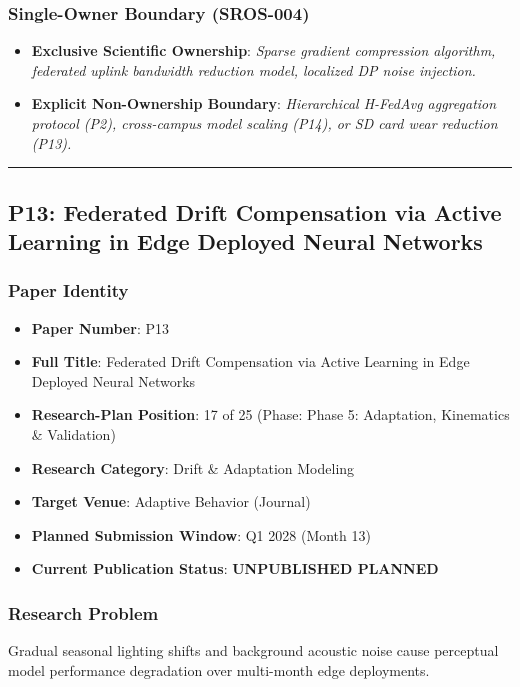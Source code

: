 \documentclass[11pt,letterpaper]{article}
\begin{document}
\subsubsection{Single-Owner Boundary (SROS-004)}
\begin{itemize}[leftmargin=*]
    \item \textbf{Exclusive Scientific Ownership}: \textit{Sparse gradient compression algorithm, federated uplink bandwidth reduction model, localized DP noise injection.}
    \item \textbf{Explicit Non-Ownership Boundary}: \textit{Hierarchical H-\allowbreak FedAvg aggregation protocol (P2), cross-\allowbreak campus model scaling (P14), or SD card wear reduction (P13).}
\end{itemize}

\vspace{0.4cm}
\hrule

\subsection{P13: Federated Drift Compensation via Active Learning in Edge Deployed Neural Networks}
\label{sec:profile_p13}

\subsubsection{Paper Identity}
\begin{itemize}[leftmargin=*]
    \item \textbf{Paper Number}: P13
    \item \textbf{Full Title}: Federated Drift Compensation via Active Learning in Edge Deployed Neural Networks
    \item \textbf{Research-Plan Position}: 17 of 25 (Phase: Phase 5: Adaptation, Kinematics \& Validation)
    \item \textbf{Research Category}: Drift \& Adaptation Modeling
    \item \textbf{Target Venue}: Adaptive Behavior (Journal)
    \item \textbf{Planned Submission Window}: Q1 2028 (Month 13)
    \item \textbf{Current Publication Status}: \textbf{UNPUBLISHED PLANNED}
\end{itemize}

\subsubsection{Research Problem}
Gradual seasonal lighting shifts and background acoustic noise cause perceptual model performance degradation over multi-\allowbreak month edge deployments.
\end{document}
